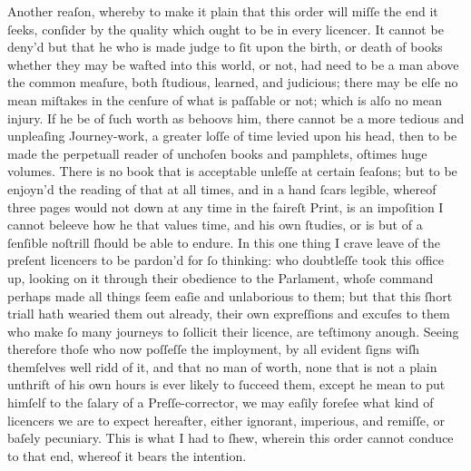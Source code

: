 Another reaſon, whereby to make it plain that this order will miſſe the end it
ſeeks, conſider by the quality which ought to be in every licencer.  It cannot
be deny'd but that he who is made judge to ſit upon the birth, or death of books
whether they may be wafted into this world, or not, had need to be a man above
the common meaſure, both ſtudious, learned, and judicious; there may be elſe no
mean miſtakes in the cenſure of what is paſſable or not; which is alſo no mean
injury.  If he be of ſuch worth as behoovs him, there cannot be a more tedious
and unpleaſing Journey-work, a greater loſſe of time levied upon his head, then
to be made the perpetuall reader of unchoſen books and pamphlets, oftimes huge
volumes.  There is no book that is acceptable unleſſe at certain ſeaſons; but to
be enjoyn'd the reading of that at all times, and in a hand ſcars legible,
whereof three pages would not down at any time in the faireſt Print, is an
impoſition I cannot beleeve how he that values time, and his own ſtudies, or is
but of a ſenſible noſtrill ſhould be able to endure.  In this one thing I crave
leave of the preſent licencers to be pardon'd for ſo thinking: who doubtleſſe
took this office up, looking on it through their obedience to the Parlament,
whoſe command perhaps made all things ſeem eaſie and unlaborious to them; but
that this ſhort triall hath wearied them out already, their own expreſſions and
excuſes to them who make ſo many journeys to ſollicit their licence, are
teſtimony anough.  Seeing therefore thoſe who now poſſeſſe the imployment, by
all evident ſigns wiſh themſelves well ridd of it, and that no man of worth,
none that is not a plain unthrift of his own hours is ever likely to ſucceed
them, except he mean to put himſelf to the ſalary of a Preſſe-corrector, we may
eaſily foreſee what kind of licencers we are to expect hereafter, either
ignorant, imperious, and remiſſe, or baſely pecuniary.  This is what I had to
ſhew, wherein this order cannot conduce to that end, whereof it bears the
intention.

